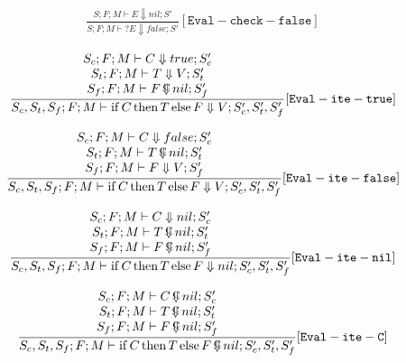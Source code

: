 \documentclass{scrartcl}
\DeclareMathOperator{\ifop}{if}
\DeclareMathOperator{\thenop}{then}
\DeclareMathOperator{\elseop}{else}
\DeclareMathOperator{\ceval}{\overset{C}{\smash{\Downarrow}}}
\begin{document}
    \begin{align*}
    \frac{
        S; F; M \vdash E \Downarrow nil; S'
    }{
        S; F; M \vdash ?E \Downarrow false; S'
    }[\mathtt{Eval-check-false}]
    \end{align*}
    
    \begin{align*}
    \frac{
        \begin{matrix}
        S_c; F; M \vdash C \Downarrow true; S_c' \\
        S_t; F; M \vdash T \Downarrow V; S_t' \\
        S_f; F; M \vdash F \ceval nil; S_f'
        \end{matrix}
    }{
        S_c, S_t, S_f; F; M \vdash \ifop C \thenop T \elseop F \Downarrow V; S_c', S_t', S_f'
    }[\mathtt{Eval-ite-true}]
    \end{align*}
    
    \begin{align*}
    \frac{
        \begin{matrix}
        S_c; F; M \vdash C \Downarrow false; S_c' \\
        S_t; F; M \vdash T  \ceval nil; S_t' \\
        S_f; F; M \vdash F \Downarrow V; S_f'
        \end{matrix}
    }{
        S_c, S_t, S_f; F; M \vdash \ifop C \thenop T \elseop F \Downarrow V; S_c', S_t', S_f'
    }[\mathtt{Eval-ite-false}]
    \end{align*}
    
    \begin{align*}
    \frac{
        \begin{matrix}
        S_c; F; M \vdash C \Downarrow nil; S_c' \\
        S_t; F; M \vdash T  \ceval nil; S_t' \\
        S_f; F; M \vdash F  \ceval nil; S_f'
        \end{matrix}
    }{
        S_c, S_t, S_f; F; M \vdash \ifop C \thenop T \elseop F \Downarrow nil; S_c', S_t', S_f'
    }[\mathtt{Eval-ite-nil}]
    \end{align*}
    
    \begin{align*}
    \frac{
        \begin{matrix}
        S_c; F; M \vdash C  \ceval nil; S_c' \\
        S_t; F; M \vdash T  \ceval nil; S_t' \\
        S_f; F; M \vdash F  \ceval nil; S_f'
        \end{matrix}
    }{
        S_c, S_t, S_f; F; M \vdash \ifop C \thenop T \elseop F  \ceval nil; S_c', S_t', S_f'
    }[\mathtt{Eval-ite-C}]
    \end{align*}
    
\end{document}
